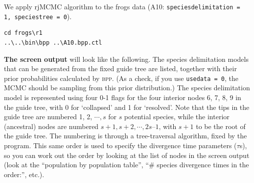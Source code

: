 \documentclass{book}
\numberwithin{equation}{section} \renewcommand{\baselinestretch}{0.55}
\begin{document}
We apply rjMCMC algorithm to the frogs data (A10:
\texttt{speciesdelimitation = 1, speciestree = 0}).
\begin{verbatim}
cd frogs\r1
..\..\bin\bpp ..\A10.bpp.ctl
\end{verbatim}
\textbf{The screen output} will look like the following.  The species
delimitation models that can be generated from the fixed guide tree
are listed, together with their prior probabilities calculated by
\textsc{bpp}.  (As a check, if you use \texttt{usedata = 0}, the MCMC
should be sampling from this prior distribution.)  The species
delimitation model is represented using four 0-1 flags for the four
interior nodes 6, 7, 8, 9 in the guide tree, with 0 for ‘collapsed’
and 1 for ‘resolved’.  Note that the tips in the guide tree are
numbered 1, 2, $\cdots, s$ for $s$ potential species, while the
interior (ancestral) nodes are numbered
$s + 1, s + 2, \cdots, 2s – 1$, with $s + 1$ to be the root of the
guide tree.  The numbering is through a tree-traversal algorithm,
fixed by the program.  This same order is used to specify the
divergence time parameters ($\tau$s), so you can work out the order by
looking at the list of nodes in the screen output (look at the
``population by population table'', ``\# species divergence times in
the order:'', etc.).
\end{document}
